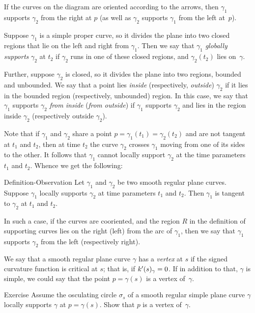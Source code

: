 If the curves on the diagram are oriented according to the arrows, then $\gamma_1$ supports $\gamma_2$ from the right at $p$ (as well as $\gamma_2$ supports $\gamma_1$ from the left at~$p$).

Suppose $\gamma_1$ is a simple proper curve, so it divides the plane into two closed regions that lie on the left and right from $\gamma_1$.
Then we say that $\gamma_1$ \emph{globally supports} $\gamma_2$ at $t_2$ 
if $\gamma_2$ runs in one of these closed regions, and 
$\gamma_2(t_2)$ lies on~$\gamma$.

Further, suppose $\gamma_2$ is closed, so it divides the plane into two regions, bounded and unbounded.
We say that a point lies {}\emph{inside} (respectively, {}\emph{outside}) $\gamma_2$ if it lies in the bounded region (respectively, unbounded) region.
In this case, we say that $\gamma_1$ supports $\gamma_2$ \emph{from inside} (\emph{from outside}) if $\gamma_1$ supports $\gamma_2$ and lies in the region inside $\gamma_2$ (respectively outside $\gamma_2$). 

Note that if $\gamma_1$ and $\gamma_2$ share a point $p=\gamma_1(t_1)=\gamma_2(t_2)$ and are not tangent at $t_1$ and $t_2$, then at time $t_2$ the curve $\gamma_2$ crosses $\gamma_1$  moving from one of its sides to the other.
It follows that $\gamma_1$ cannot locally support $\gamma_2$ at the time parameters $t_1$ and $t_2$.
Whence we get the following:

\begin{thm}{Definition-Observation}
Let $\gamma_1$ and $\gamma_2$ be two smooth regular plane curves.
Suppose $\gamma_1$ locally supports $\gamma_2$ at time parameters $t_1$ and $t_2$.
Then $\gamma_1$ is tangent to $\gamma_2$ at $t_1$ and $t_2$.

In such a case, if the curves are cooriented, and the region $R$ in the definition of supporting curves lies on the right (left) from the arc of $\gamma_1$, then we say that 
$\gamma_1$ supports $\gamma_2$ from the left (respectively right).
\end{thm}

We say that a smooth regular plane curve $\gamma$ has a \emph{vertex} at $s$
if the signed curvature function is critical at $s$;
that is, if $k'(s)_\gamma=0$.
If in addition to that, $\gamma$ is simple, we could say that the point $p=\gamma(s)$ is a vertex of~$\gamma$.

\begin{thm}{Exercise}\label{ex:vertex-support}
Assume the osculating circle $\sigma_s$ of a smooth regular simple plane curve $\gamma$ locally supports $\gamma$ at $p=\gamma(s)$.
Show that $p$ is a vertex of~$\gamma$.
\end{thm}

